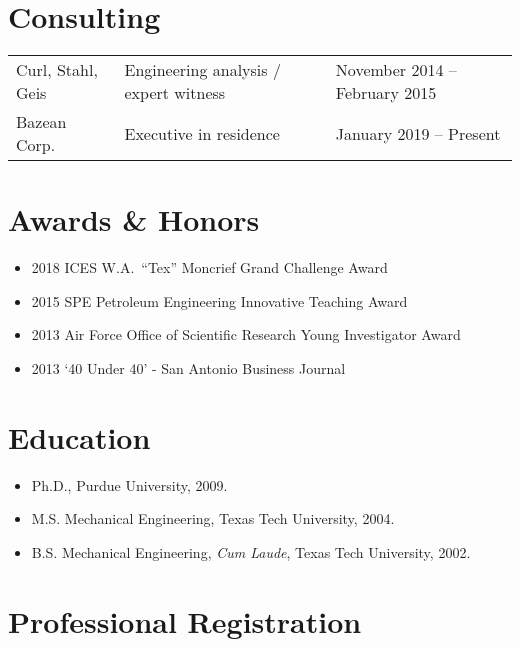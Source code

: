 \section*{Consulting}

\begin{tabular}{lll}
    Curl, Stahl, Geis  & Engineering analysis / expert witness  & November 2014 -- February 2015 \\
    Bazean Corp. & Executive in residence & January 2019 -- Present
\end{tabular}

\section*{Awards \& Honors}

\begin{itemize}
    \item 2018 ICES W.A.\ ``Tex'' Moncrief Grand Challenge Award
    \item 2015 SPE Petroleum Engineering Innovative Teaching Award 
    \item 2013 Air Force Office of Scientific Research Young Investigator Award
    \item 2013 `40 Under 40' - San Antonio Business Journal
\end{itemize}
\else
\section*{Education}

\begin{itemize}
    \item Ph.D., Purdue University, 2009.
    \item M.S. Mechanical Engineering, Texas Tech University, 2004.
    \item B.S. Mechanical Engineering, \textit{Cum Laude},
    Texas Tech University, 2002.
\end{itemize}

\section*{Professional Registration}

